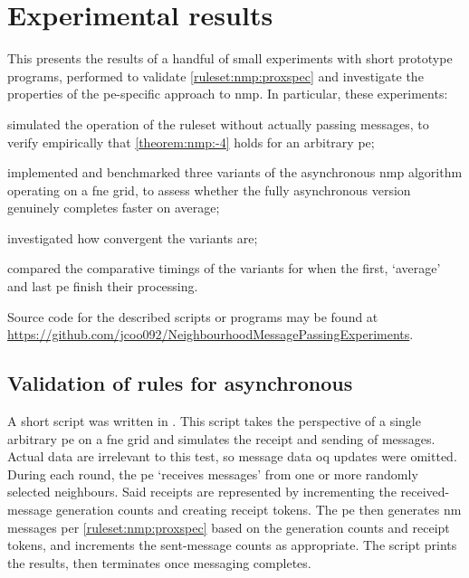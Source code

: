 \section{\label{sec:nmp:experiments}Experimental results}

This  presents the results of a handful of small experiments with short prototype programs, performed to validate \cref{ruleset:nmp:proxspec} and investigate the properties of the \gls{pe}-specific approach to \gls{nmp}.  In particular, these experiments:
\begin{inparaenum}[(i)]
\item simulated the operation of the \gls{ruleset} without actually passing messages, to verify empirically that \cref{theorem:nmp:-4} holds for an arbitrary \gls{pe};
\item implemented and benchmarked three variants of the asynchronous \gls{nmp} algorithm operating on a \gls{fne} grid, to assess whether the fully asynchronous version genuinely completes faster on average;
\item investigated how convergent the variants are;
\item compared the comparative timings of the variants for when the first, `average' and last \gls{pe} finish their processing.
\end{inparaenum}
Source code for the described scripts or programs may be found at \url{https://github.com/jcoo092/NeighbourhoodMessagePassingExperiments}.

\subsection{Validation of rules for asynchronous \texorpdfstring{}{neighbourhood message passing}}
A short script was written in \fsharp{}.  This script takes the perspective of a single arbitrary \gls{pe} on a \gls{fne} grid and simulates the receipt and sending of messages.  Actual data are irrelevant to this test, so message data \gls{oq} updates were omitted.  During each round, the \gls{pe} `receives messages' from one or more randomly selected neighbours.  Said receipts are represented by incrementing the received-message generation counts and creating receipt tokens.  The \gls{pe} then generates \gls{nm} messages per \cref{ruleset:nmp:proxspec} based on the generation counts and receipt tokens, and increments the sent-message counts as appropriate.  The script prints the results, then terminates once messaging completes.

